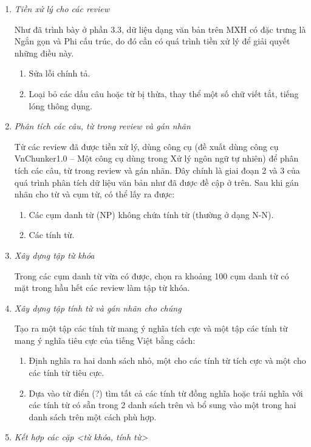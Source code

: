 \documentclass[12pt]{extarticle}
\begin{document}
			 	\begin{enumerate}
					\item \textit{Tiền xử lý cho các review}
						\par Như đã trình bày ở phần 3.3, dữ liệu dạng văn bản trên MXH có đặc trưng là Ngắn gọn và Phi cấu trúc, do đó cần có quá trình tiền xử lý để giải quyết những điều này.
						\begin{enumerate}
							\item Sửa lỗi chính tả.
							\item 	Loại bỏ các dấu câu hoặc từ bị thừa, thay thể một số chữ viết tắt, tiếng lóng thông dụng.
						\end{enumerate}
					\item \textit{Phân tích các câu, từ trong review và gán nhãn}
						\par Từ các review đã được tiền xử lý, dùng công cụ (đề xuất dùng công cụ VnChunker1.0 – Một công cụ dùng trong Xử lý ngôn ngữ tự nhiên) để phân tích các câu, từ trong review và gán nhãn. Đây chính là giai đoạn 2 và 3 của quá trình phân tích dữ liệu văn bản như đã được đề cập ở trên. Sau khi gán nhãn cho từ và cụm từ, có thể lấy ra được:
						\begin{enumerate}
							\item Các cụm danh từ (NP) không chứa tính từ (thường ở dạng N-N).
							\item Các tính từ.
						\end{enumerate}
					\item \textit{Xây dựng tập từ khóa}
						\par Trong các cụm danh từ vừa có được, chọn ra khoảng 100 cụm danh từ có mặt trong hầu hết các review làm tập từ khóa.
					\item\textit{ Xây dựng tập tính từ và gán nhãn cho chúng}
						\par Tạo ra một tập các tính từ mang ý nghĩa tích cực và một tập các tính từ mang ý nghĩa tiêu cực của tiếng Việt bằng cách:
						\begin{enumerate}
							\item Định nghĩa ra hai danh sách nhỏ, một cho các tính từ tích cực và một cho các tính từ tiêu cực.
							\item Dựa vào từ điển (?) tìm tất cả các tính từ đồng nghĩa hoặc trái nghĩa với các tính từ có sẵn trong 2 danh sách trên và bổ sung vào một trong hai danh sách trên một cách phù hợp.
						\end{enumerate}
					\item \textit{Kết hợp các cặp <từ khóa, tính từ>}

\end{enumerate}
\end{document}
